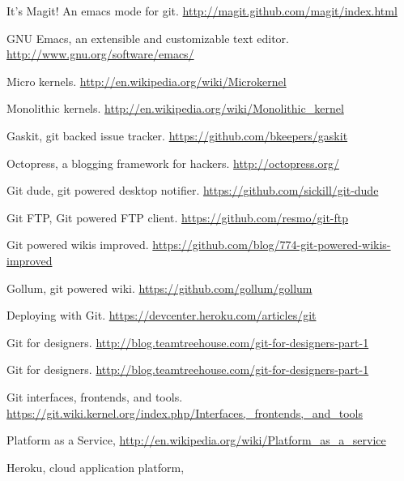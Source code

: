 \cleardoublepage
{}
{}
\begin{thebibliography}{99}

 It's Magit! An emacs mode for git.
  \url{ http://magit.github.com/magit/index.html}

 GNU Emacs, an extensible and customizable text editor.
  \url{http://www.gnu.org/software/emacs/}

 Micro kernels.
  \url{http://en.wikipedia.org/wiki/Microkernel}

 Monolithic kernels.
  \url{http://en.wikipedia.org/wiki/Monolithic_kernel}

 Gaskit, git backed issue tracker.
  \url{https://github.com/bkeepers/gaskit}

 Octopress, a blogging framework for hackers.
  \url{http://octopress.org/}

 Git dude, git powered desktop notifier.
  \url{https://github.com/sickill/git-dude}

 Git FTP, Git powered FTP client.
  \url{https://github.com/resmo/git-ftp}

 Git powered wikis improved.
  \url{https://github.com/blog/774-git-powered-wikis-improved}

 Gollum, git powered wiki.
  \url{https://github.com/gollum/gollum}

 Deploying with Git.
  \url{https://devcenter.heroku.com/articles/git}

 Git for designers.
  \url{http://blog.teamtreehouse.com/git-for-designers-part-1}

 Git for designers.
  \url{http://blog.teamtreehouse.com/git-for-designers-part-1}

 Git interfaces, frontends, and tools.
  \url{https://git.wiki.kernel.org/index.php/Interfaces,_frontends,_and_tools}

 Platform as a Service,
  \url{http://en.wikipedia.org/wiki/Platform_as_a_service}

 Heroku, cloud application platform,

\end{thebibliography}
